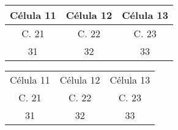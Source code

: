 \documentclass[a4paper,12pt]{article}
\begin{document}
	\linhabase\hfill
	\begin{tabular}[c]{*{3}{c}}
		\hline
		Célula 11 & Célula 12 & Célula 13 \\
		\hline
		C. 21     & C. 22     & C. 23     \\
		\hline
		31        & 32        & 33        \\
		\hline
	\end{tabular}%
	\hfill\null
		
	
	\linhabase\hfill
	\begin{tabular}[c]{ccc}
		\cline{1-3}
		Célula 11 & Célula 12 & Célula 13 \\
		\cline{1-2}\cline{2-2} %
		C. 21     & C. 22     & C. 23     \\
		\cline{1-1}
		31        & 32        & 33        \\
		\cline{2-3}
	\end{tabular}%
	\hfill\null
			
\end{document}
